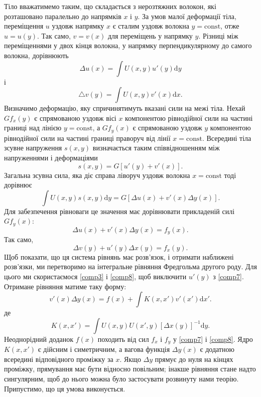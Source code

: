 \documentclass[14pt,twoside]{extreport}
\theoremstyle{mystyle}
\numberwithin{equation}{chapter}
\begin{document}
Тіло вважатимемо таким, що складається з нерозтяжних волокон, які розташовано паралельно до напрямків $x$ і $y$. За умов малої деформації тіла, переміщення $u$ уздовж напрямку $x$ є сталим уздовж волокна $y=\textrm{const}$, отже $u=u(y)$. Так само, $v=v(x)$ для переміщень у напрямку $y$. Різниці між переміщеннями у двох кінця волокна, у напрямку перпендикулярному до самого волокна, дорівнюють
\begin{equation}\label{comp3}
	\displaystyle \Delta u(x)=\int U(x, y)u'(y)\mathrm{d}y 
\end{equation}
і
\begin{equation}\label{comp4}
	\displaystyle \triangle v(y)=\int U(x, y)v'(x)\mathrm{d}x. 
\end{equation}
Визначимо деформацію, яку спричинятимуть вказані сили на межі тіла. Нехай $Gf_{x}(y)$ є спрямованою уздовж вісі $x$ компонентою рівнодійної сили на частині границі над лінією $y=\textrm{const}$, а $Gf_{y}(x)$ є спрямованою уздовж $y$ компонентою рівнодійної сили на частині границі праворуч від лінії $x=\textrm{const}$. Всередині тіла зсувне напруження $s(x, y)$ визначається таким співвідношенням між напруженнями і деформаціями
\begin{equation}\label{comp5}
	s(x, y)=G[u'(y)+v'(x)]. 
\end{equation}
Загальна зсувна сила, яка діє справа ліворуч уздовж волокна $x=\textrm{const}$ тоді дорівнює
\begin{equation}\label{comp6}
	\displaystyle \int U(x, y)s(x, y)\mathrm{d}y=G[\Delta u(x)+v'(x)\Delta y(x)]. 
\end{equation}
Для забезпечення рівноваги це значення має дорівнювати прикладеній силі $Gf_{y}(x)$:
\begin{equation}\label{comp7}
	\Delta u(x)+v'(x)\Delta y(x)=f_{y}(x).
\end{equation}
Так само,
\begin{equation}\label{comp8}
	\Delta v(y)+u'(y)\Delta x(y)=f_{x}(y).
\end{equation}
Щоб показати, що ця система рівнянь має розв'язок, і отримати наближені розв'язки, ми перетворимо на інтегральне рівняння Фредгольма другого роду. Для цього ми скористаємося \eqref{comp3} і \eqref{comp8}, щоб виключити $u'(y)$ з \eqref{comp7}. Отримане рівняння матиме таку форму:
\begin{equation}\label{comp9}
	v'(x)\displaystyle \Delta y(x)=f(x)+\int K(x, x')v'(x')\mathrm{d}x'. 
\end{equation}
де
\begin{equation}\label{comp10}
	K(x,\displaystyle  x')=\int U(x, y)U(x', y)[\Delta x(y)]^{-1}\mathrm{d}y.
\end{equation}
Неоднорідний доданок $f(x)$ походить від сил $f_{x}$ і $f_{y}$ у \eqref{comp7} і \eqref{comp8}. Ядро $K(x, x')$ є дійсним і симетричним, а вагова функція $\Delta y(x)$ є додатною всередині відповідного проміжку за $x$. Якщо $\Delta y$ прямує до нуля на кінцях проміжку, прямування має бути відносно повільним; інакше рівняння стане надто сингулярним, щоб до нього можна було застосувати розвинуту нами теорію. Припустимо, що ця умова виконується.
\end{document}
